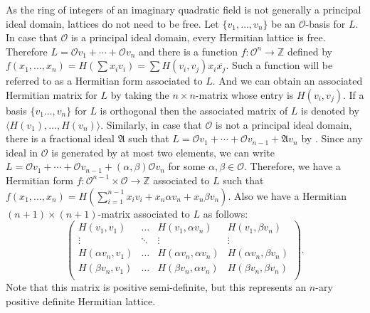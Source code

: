 \documentclass[a4paper,10pt,reqno]{amsart}
\begin{document}
As the ring of integers of an imaginary quadratic field is not generally a principal ideal domain,
lattices do not need to be free. Let $\{ v_1, \dotsc, v_n \}$ be an ${\mathcal{O}}$-basis for $L$. In case
that ${\mathcal{O}}$ is a principal ideal domain, every Hermitian lattice is free. Therefore $L = {\mathcal{O}} v_1
+ \dotsb + {\mathcal{O}} v_n$ and there is a function $f : {\mathcal{O}}^n \longrightarrow \mathbb{Z}$ defined by
$f(x_1, \dotsc, x_n) = H(\sum x_i v_i) = \sum H(v_i, v_j) x_i {\overline{{x_j}}}$. Such a function will be
referred to as a Hermitian form associated to $L$. And we can obtain an associated Hermitian matrix
for $L$ by taking the $n \times n$-matrix whose entry is $H(v_i, v_j)$. If a basis $\{v_1 \dotsc,
v_n \}$ for $L$ is orthogonal then the associated matrix of $L$ is denoted by ${\langle {H(v_1), \dotsc,
H(v_n)} \rangle}$. Similarly, in case that ${\mathcal{O}}$ is not a principal ideal domain, there is a fractional
ideal $\mathfrak{A}$ such that $L= {\mathcal{O}} v_1 + \dotsb + {\mathcal{O}} v_{n-1} + \mathfrak{A} v_n$ by
\cite[81:5]{oO_73}. Since any ideal in ${\mathcal{O}}$ is generated by at most two elements, we can write
$L= {\mathcal{O}} v_1 + \dotsb + {\mathcal{O}} v_{n-1} + (\alpha, \beta){\mathcal{O}} v_n$ for some $\alpha, \beta \in
{\mathcal{O}}$. Therefore, we have a Hermitian form $f : {\mathcal{O}}^{n-1} \times {\mathcal{O}} \longrightarrow
\mathbb{Z}$ associated to $L$ such that $f(x_1, \dotsc, x_n) = H(\sum _{i=1} ^{n-1} x_i v_i + x_n
\alpha v_n + x_n \beta v_n)$. Also we have a Hermitian $(n+1) \times (n+1)$-matrix associated to
$L$ as follows:
\[
    \begin{pmatrix}
        H(v_1, v_1)         & \dotsc & H(v_1, \alpha v_n)        & H(v_1, \beta v_n)\\
        \vdots              & \ddots & \vdots                    &\vdots\\
        H(\alpha v_n,  v_1) & \dotsc & H(\alpha v_n, \alpha v_n) & H(\alpha v_n, \beta v_n)\\
        H(\beta  v_n,  v_1) & \dotsc & H(\beta  v_n, \alpha  v_n) & H(\beta  v_n, \beta v_n)\\
    \end{pmatrix}.
\]
Note that this matrix is positive semi-definite, but this represents an $n$-ary positive definite
Hermitian lattice.
\end{document}
